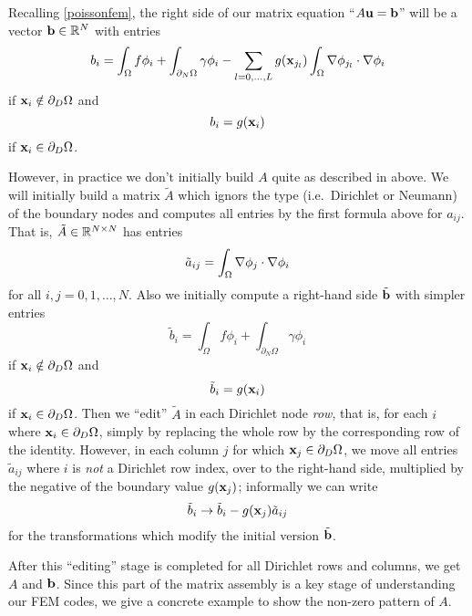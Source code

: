 Recalling \eqref{poissonfem}, the right side of our matrix equation ``$A \mathbf{u} = \mathbf{b}$'' will be a vector $\mathbf{b}\in\mathbb{R}^N$ with entries
    $$b_i = \int_\Omega f \phi_i + \int_{\partial_N\Omega} \gamma \phi_i - \sum_{l=0,\dots,L} g(\mathbf{x}_{j_l})  \int_\Omega \nabla \phi_{j_l} \cdot \nabla \phi_i$$
if $\mathbf{x}_i \notin \partial_D \Omega$ and
    $$b_i = g(\mathbf{x}_{i})$$
if $\mathbf{x}_i \in \partial_D \Omega$.

However, in practice we don't initially build $A$ quite as described in above.  We will initially build a matrix $\tilde A$ which ignors the type (i.e.~Dirichlet or Neumann) of the boundary nodes and computes all entries by the first formula above for $a_{ij}$.  That is, $\tilde A \in \mathbb{R}^{N\times N}$ has entries
\begin{equation*}
\tilde a_{ij} = \int_\Omega \nabla \phi_j \cdot \nabla \phi_i
\end{equation*}
for all $i,j=0,1,\dots,N$.  Also we initially compute a right-hand side $\tilde {\mathbf{b}}$ with simpler entries
    $$\tilde b_i = \int_\Omega f \phi_i + \int_{\partial_N\Omega} \gamma \phi_i$$
if $\mathbf{x}_i \notin \partial_D \Omega$ and
    $$\tilde b_i = g(\mathbf{x}_{i})$$
if $\mathbf{x}_i \in \partial_D \Omega$.  Then we ``edit'' $\tilde A$ in each Dirichlet node \emph{row}, that is, for each $i$ where $\mathbf{x}_i \in \partial_D \Omega$, simply by replacing the whole row by the corresponding row of the identity.  However, in each column $j$ for which $\mathbf{x}_j \in \partial_D \Omega$, we move all entries $\tilde a_{ij}$ where $i$ is \emph{not} a Dirichlet row index, over to the right-hand side, multiplied by the negative of the boundary value $g(\mathbf{x}_{j})$; informally we can write
    $$\tilde b_i \to \tilde b_i - g(\mathbf{x}_{j}) \tilde a_{ij}$$
for the transformations which modify the initial version $\tilde {\mathbf{b}}$.

After this ``editing'' stage is completed for all Dirichlet rows and columns, we get $A$ and $\mathbf{b}$.  Since this part of the matrix assembly is a key stage of understanding our FEM codes, we give a concrete example to show the non-zero pattern of $A$.

